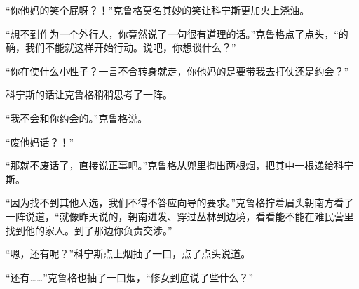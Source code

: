 “你他妈的笑个屁呀？！”克鲁格莫名其妙的笑让科宁斯更加火上浇油。

“想不到作为一个外行人，你竟然说了一句很有道理的话。”克鲁格点了点头，“的确，我们不能就这样开始行动。说吧，你想谈什么？”

“你在使什么小性子？一言不合转身就走，你他妈的是要带我去打仗还是约会？”

科宁斯的话让克鲁格稍稍思考了一阵。

“我不会和你约会的。”克鲁格说。

“废他妈话？！”

“那就不废话了，直接说正事吧。”克鲁格从兜里掏出两根烟，把其中一根递给科宁斯。

“因为找不到其他人选，我们不得不答应向导的要求。”克鲁格拧着眉头朝南方看了一阵说道，“就像昨天说的，朝南进发、穿过丛林到边境，看看能不能在难民营里找到他的家人。到了那边你负责交涉。”

“嗯，还有呢？”科宁斯点上烟抽了一口，点了点头说道。

“还有……”克鲁格也抽了一口烟，“修女到底说了些什么？”